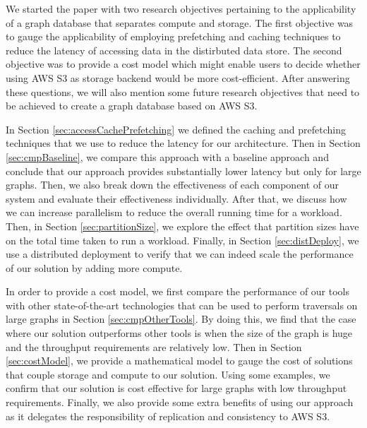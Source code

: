 We started the paper with two research objectives pertaining to the
applicability of a graph database that separates compute and storage. The first
objective was to gauge the applicability of employing prefetching and caching
techniques to reduce the latency of accessing data in the distirbuted data
store. The second objective was to provide a cost model which might enable users
to decide whether using AWS S3 as storage backend would be more cost-efficient.
After answering these questions, we will also mention some future research
objectives that need to be achieved to create a graph database based on AWS S3.

\medskip
In Section \ref{sec:accessCachePrefetching} we defined the caching and
prefetching techniques that we use to reduce the latency for our architecture.
Then in Section \ref{sec:cmpBaseline}, we compare this approach with a baseline
approach and conclude that our approach provides substantially lower latency but
only for large graphs. Then, we also break down the effectiveness of each
component of our system and evaluate their effectiveness individually. After
that, we discuss how we can increase parallelism to reduce the overall running
time for a workload. Then, in Section \ref{sec:partitionSize}, we
explore the effect that partition sizes have on the total time taken to run a
workload. Finally, in Section \ref{sec:distDeploy}, we use a distributed
deployment to verify that we can indeed scale the performance of our solution by
adding more compute.

\medskip
In order to provide a cost model, we first compare the performance of our tools
with other state-of-the-art technologies that can be used to perform traversals
on large graphs in Section \ref{sec:cmpOtherTools}. By doing this, we find that 
the case where our solution outperforms other tools is when the size of the
graph is huge and the throughput requirements are relatively low. Then in
Section \ref{sec:costModel}, we provide a mathematical model to gauge the cost
of solutions that couple storage and compute to our solution. Using some
examples, we confirm that our solution is cost effective for large graphs with
low throughput requirements. Finally, we also provide some extra benefits of
using our approach as it delegates the responsibility of replication and
consistency to AWS S3.

